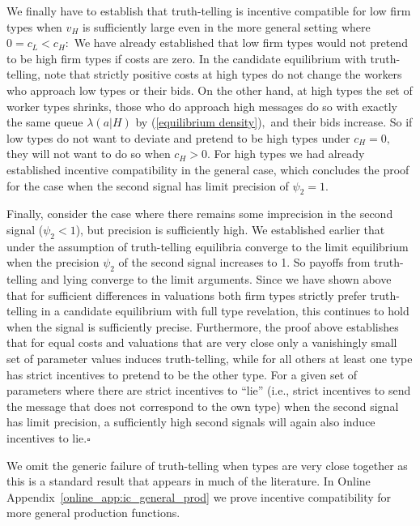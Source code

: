 \documentclass[12pt]{article}
\begin{document}
We finally have to establish that truth-telling is incentive compatible for
low firm types when $v_{H}$ is sufficiently large even in the more general
setting where $0=c_{L}<c_{H}:$ We have already established that low firm
types would not pretend to be high firm types if costs are zero. In the
candidate equilibrium with truth-telling, note that strictly positive costs
at high types do not change the workers who approach low types or their
bids. On the other hand, at high types the set of worker types shrinks,
those who do approach high messages do so with exactly the same queue $%
\lambda (a|H)$ by (\ref{equilibrium density})$,$ and their bids increase. So
if low types do not want to deviate and pretend to be high types under $%
c_{H}=0,$ they will not want to do so when $c_{H}>0.$ For high types we had
already established incentive compatibility in the general case, which
concludes the proof for the case when the second signal has limit precision of $\psi_2=1$. 

Finally, consider the case where there remains some imprecision in the second signal ($\psi_2 <1$), but precision is sufficiently high. We established earlier that under the assumption of truth-telling equilibria converge to the limit equilibrium when the precision $\psi_2$ of the second signal increases to 1. So payoffs from truth-telling and lying converge to the limit arguments. Since we have shown above that for sufficient differences in valuations both firm types strictly prefer truth-telling in a candidate equilibrium with full type revelation, this continues to hold when the signal is sufficiently precise. Furthermore, the proof above establishes that for equal costs and valuations that are very close only a vanishingly small set of parameter values induces truth-telling, while for all others at least one type has strict incentives to pretend to be the other type. For a given set of parameters where there are strict incentives to ``lie'' (i.e., strict incentives to send the message that does not correspond to the own type) when the second signal has limit precision, a sufficiently high second signals will again also induce incentives to lie.$\square $ 

\bigskip

We omit the generic failure of truth-telling when types are very close together as this is a standard result that appears in much of the literature. In Online Appendix~\ref{online_app:ic_general_prod} we prove incentive compatibility for more general production functions.
\end{document}

